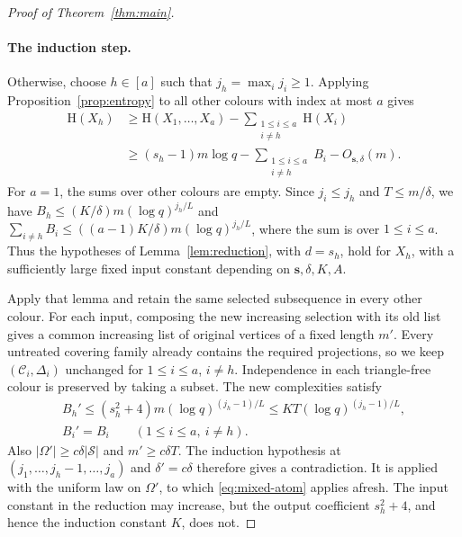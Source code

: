 \documentclass[11pt,a4paper]{article}
\numberwithin{equation}{section}
\newcommand{\HH}{\mathrm H}
\newcommand{\cC}{\mathcal C}
\newcommand{\cS}{\mathcal S}
\begin{document}
\begin{proof}[Proof of Theorem~\ref{thm:main}]
\paragraph{The induction step.}
Otherwise, choose $h\in[a]$ such that
$j_h=\max_i j_i\ge1$.
Applying Proposition~\ref{prop:entropy} to all other colours
with index at most $a$ gives
\begin{equation}\label{eq:marginal}
 \begin{aligned}
 \HH(X_h)
 &\ge\HH(X_1,\ldots,X_a)-\sum_{\substack{1\le i\le a\\i\ne h}}\HH(X_i)\\
 &\ge(s_h-1)m\log q-\sum_{\substack{1\le i\le a\\i\ne h}}B_i
       -O_{\boldsymbol{s},\delta}(m).
 \end{aligned}
\end{equation}
For $a=1$, the sums over other colours are empty.
Since $j_i\le j_h$ and $T\le m/\delta$, we have
$B_h\le(K/\delta)m(\log q)^{j_h/L}$ and
$\sum_{i\ne h}B_i\le((a-1)K/\delta)m(\log q)^{j_h/L}$,
where the sum is over $1\le i\le a$.
Thus the hypotheses of Lemma~\ref{lem:reduction}, with $d=s_h$,
hold for $X_h$, with a sufficiently large fixed input constant
depending on $\boldsymbol{s},\delta,K,A$.

Apply that lemma and retain the same selected subsequence in
every other colour.
For each input, composing the new increasing selection with
its old list gives a common increasing list of original
vertices of a fixed length $m'$.
Every untreated covering family already contains the required projections,
so we keep $(\cC_i,\Delta_i)$ unchanged for $1\le i\le a$, $i\ne h$.
Independence in each triangle-free colour is preserved by taking a subset.
The new complexities satisfy
\begin{equation}\label{eq:descent}
 \begin{gathered}
 B_h'\le(s_h^2+4)m(\log q)^{(j_h-1)/L}
       \le KT(\log q)^{(j_h-1)/L},\\
 B_i'=B_i\qquad(1\le i\le a,\ i\ne h).
 \end{gathered}
\end{equation}
Also $|\Omega'|\ge c\delta|\cS|$ and $m'\ge c\delta T$.
The induction hypothesis at
$(j_1,\ldots,j_h-1,\ldots,j_a)$ and $\delta'=c\delta$
therefore gives a contradiction. It is applied with the uniform
law on $\Omega'$, to which \eqref{eq:mixed-atom} applies afresh.
The input constant in the reduction may increase, but the
output coefficient $s_h^2+4$, and hence the induction constant $K$,
does not.


\end{proof}
\end{document}
